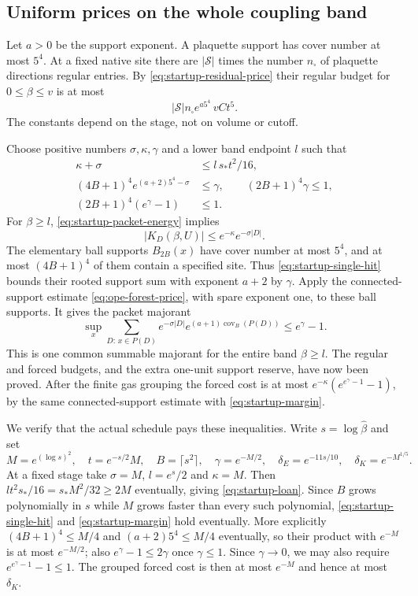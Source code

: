 \subsection{Uniform prices on the whole coupling band}
Let $a>0$ be the support exponent. A plaquette support has cover
number at most $5^4$. At a fixed native site there are
$|\mathcal S|$ times the number $n_\square$ of plaquette directions
regular entries. By \eqref{eq:startup-residual-price} their regular
budget for $0\le\beta\le v$ is at most
\begin{equation}\label{eq:startup-regular-book}
             |\mathcal S|n_\square e^{a5^4}\,vCt^5.
\end{equation}
The constants depend on the stage, not on volume or cutoff.

Choose positive numbers $\sigma,\kappa,\gamma$ and a lower band
endpoint $l$ such that
\begin{align}
 \kappa+\sigma&\le l\,s_*t^2/16,\label{eq:startup-loan}\\
 (4B+1)^4e^{(a+2)5^4-\sigma}&\le\gamma,\qquad
 (2B+1)^4\gamma\le1,\label{eq:startup-single-hit}\\
 (2B+1)^4(e^\gamma-1)&\le1.\label{eq:startup-margin}
\end{align}
For $\beta\ge l$, \eqref{eq:startup-packet-energy} implies
\[
               |K_D(\beta,U)|\le e^{-\kappa}e^{-\sigma|D|}.
\]
The elementary ball supports $B_{2B}(x)$ have cover number at most
$5^4$, and at most $(4B+1)^4$ of them contain a specified site.
Thus \eqref{eq:startup-single-hit} bounds their rooted support sum
with exponent $a+2$ by $\gamma$. Apply the connected-support
estimate \eqref{eq:ope-forest-price}, with spare exponent one, to
these ball supports. It gives the packet majorant
\[
 \sup_x\sum_{D:\,x\in P(D)}
          e^{-\sigma|D|}e^{(a+1)\operatorname{cov}_B(P(D))}
                        \le e^\gamma-1.
\]
This is one common summable majorant for the entire band
$\beta\ge l$. The regular and forced budgets, and the extra
one-unit support reserve, have now been proved. After the
finite gas grouping the forced cost is at most
$e^{-\kappa}(e^{e^\gamma-1}-1)$, by the same connected-support
estimate with \eqref{eq:startup-margin}.

We verify that the actual schedule pays these inequalities. Write
$s=\log\widehat\beta$ and set
\[
 M=e^{(\log s)^2},\quad t=e^{-s/2}M,\quad B=\lceil s^2\rceil,
 \quad \gamma=e^{-M/2},\quad
 \delta_E=e^{-11s/10},\quad \delta_K=e^{-M^{1/5}}.
\]
At a fixed stage take $\sigma=M$, $l=e^s/2$ and $\kappa=M$.
Then $lt^2s_*/16=s_*M^2/32\ge2M$ eventually, giving
\eqref{eq:startup-loan}. Since $B$ grows polynomially in $s$
while $M$ grows faster than every such polynomial,
\eqref{eq:startup-single-hit} and \eqref{eq:startup-margin}
hold eventually. More explicitly $(4B+1)^4\le M/4$ and
$(a+2)5^4\le M/4$ eventually, so their product with
$e^{-M}$ is at most $e^{-M/2}$; also
$e^\gamma-1\le2\gamma$ once $\gamma\le1$.
Since $\gamma\to0$, we may also require
$e^{e^\gamma-1}-1\le1$. The grouped forced cost is then at most
$e^{-M}$ and hence at most $\delta_K$.

